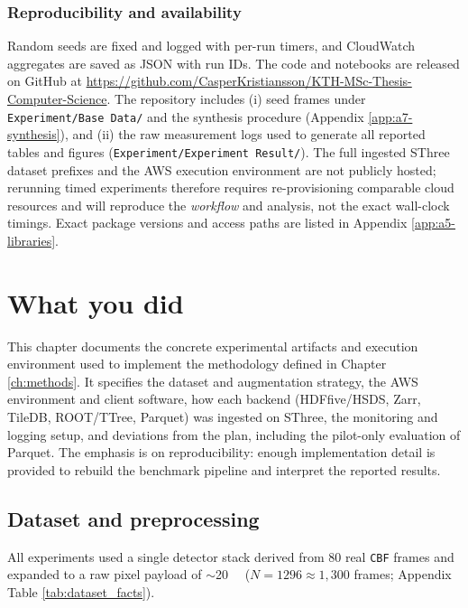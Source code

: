 \documentclass[nomenclature, english, bibtex]{kththesis}
\numberwithin{listing}{chapter}
\begin{document}
\subsection{Reproducibility and availability}
Random seeds are fixed and logged with per-run timers, and CloudWatch aggregates are saved as \gls{JSON} with run IDs. The code and notebooks are released on GitHub at \url{https://github.com/CasperKristiansson/KTH-MSc-Thesis-Computer-Science}. The repository includes (i) seed frames under \texttt{Experiment/Base Data/} and the synthesis procedure (Appendix \ref{app:a7-synthesis}), and (ii) the raw measurement logs used to generate all reported tables and figures (\texttt{Experiment/Experiment Result/}). The full ingested \gls{SThree} dataset prefixes and the \gls{AWS} execution environment are not publicly hosted; rerunning timed experiments therefore requires re-provisioning comparable cloud resources and will reproduce the \emph{workflow} and analysis, not the exact wall-clock timings. Exact package versions and access paths are listed in Appendix \ref{app:a5-libraries}.



















\cleardoublepage
\chapter{What you did}
\label{ch:whatYouDid}
This chapter documents the concrete experimental artifacts and execution environment used to implement the methodology defined in Chapter \ref{ch:methods}. It specifies the dataset and augmentation strategy, the \gls{AWS} environment and client software, how each backend (\gls{HDFfive}/\gls{HSDS}, Zarr, TileDB, \gls{ROOT}/\gls{TTree}, Parquet) was ingested on \gls{SThree}, the monitoring and logging setup, and deviations from the plan, including the pilot-only evaluation of Parquet. The emphasis is on reproducibility: enough implementation detail is provided to rebuild the benchmark pipeline and interpret the reported results.

\section{Dataset and preprocessing}
All experiments used a single detector stack derived from 80 real \texttt{CBF} frames and expanded to a raw pixel payload of \(\sim\)\SI{20}{\gibi\byte} (\(N{=}1296\approx1{,}300\) frames; Appendix Table \ref{tab:dataset_facts}).
\end{document}
